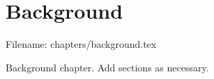 \chapter{Background}
\label{ch:background}
Filename: chapters/background.tex

Background chapter. Add sections as necessary.


